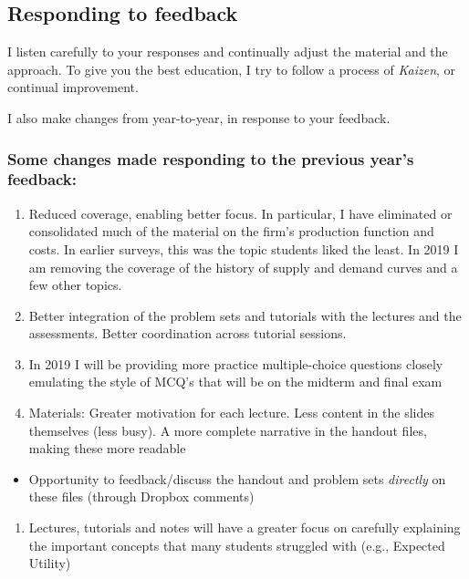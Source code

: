 \documentclass[]{article}
\providecommand{\tightlist}{%
  \setlength{\itemsep}{0pt}\setlength{\parskip}{0pt}}
\begin{document}
\hypertarget{responding-to-feedback}{%
\subsection{Responding to feedback}\label{responding-to-feedback}}

I listen carefully to your responses and continually adjust the material and the approach. To give you the best education, I try to follow a process of \emph{Kaizen}, or continual improvement.

I also make changes from year-to-year, in response to your feedback.

\hypertarget{some-changes-made-responding-to-the-previous-years-feedback}{%
\subsubsection{Some changes made responding to the previous year's feedback:}\label{some-changes-made-responding-to-the-previous-years-feedback}}

\begin{enumerate}
\def\labelenumi{\arabic{enumi}.}
\item
  Reduced coverage, enabling better focus. In particular, I have eliminated or consolidated much of the material on the firm's production function and costs. In earlier surveys, this was the topic students liked the least. In 2019 I am removing the coverage of the history of supply and demand curves and a few other topics.
\item
  Better integration of the problem sets and tutorials with the lectures and the assessments. Better coordination across tutorial sessions.
\item
  In 2019 I will be providing more practice multiple-choice questions closely emulating the style of MCQ's that will be on the midterm and final exam
\item
  Materials: Greater motivation for each lecture. Less content in the slides themselves (less busy). A more complete narrative in the handout files, making these more readable
\end{enumerate}

\begin{itemize}
\tightlist
\item
  Opportunity to feedback/discuss the handout and problem sets \emph{directly} on these files (through Dropbox comments)
\end{itemize}

\begin{enumerate}
\def\labelenumi{\arabic{enumi}.}
\setcounter{enumi}{4}
\tightlist
\item
  Lectures, tutorials and notes will have a greater focus on carefully explaining the important concepts that many students struggled with (e.g., Expected Utility)
\end{enumerate}
\end{document}
